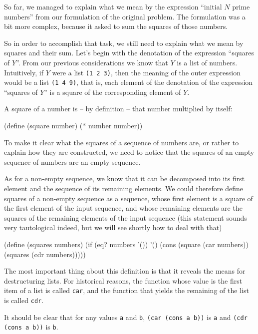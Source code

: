 So far, we managed to explain what we mean by the expression 
``initial $N$ prime numbers'' from our formulation of the original 
problem. The formulation was a bit more complex, because it asked
to sum the squares of those numbers.

So in order to accomplish that task, we still need to explain what
we mean by squares and their sum. Let's begin with the denotation
of the expression ``squares of $Y$''. From our previous
considerations we know that $Y$ is a list of numbers. Intuitively, 
if $Y$ were a list \texttt{(1 2 3)}, then the meaning of the outer
expression would be a list \texttt{(1 4 9)}, that is,
each element of the denotation of the expression ``squares of $Y$''
is a square of the corresponding element of $Y$.

A square of a number is -- by definition -- that number multiplied
by itself:

\begin{Snippet}
(define (square number)
  (* number number))
\end{Snippet}

To make it clear what the squares of a sequence of numbers are, or
rather to explain how they are constructed, we need to notice that
the squares of an empty sequence of numbers are an empty sequence.

As for a non-empty sequence, we know that it can be decomposed into
its first element and the sequence of its remaining elements. We
could therefore define squares of a non-empty sequence as a sequence,
whose first element is a square of the first element of the input
sequence, and whose remaining elements are the squares of the
remaining elements of the input sequence (this statement sounds
very tautological indeed, but we will see shortly how to deal
with that)

\begin{Snippet}
(define (squares numbers)
  (if (eq? numbers '())
    '()
    (cons (square (car numbers)) (squares (cdr numbers)))))
\end{Snippet}

The most important thing about this definition is that it reveals
the means for destructuring lists. For historical reasons, the
function whose value is the first item of a list is called
\texttt{car}, and the function that yields the remaining of
the list is called \texttt{cdr}.

It should be clear that for any values \texttt{a} and \texttt{b},
\texttt{(car (cons a b))} is \texttt{a} and \texttt{(cdr (cons a b))}
is \texttt{b}.

